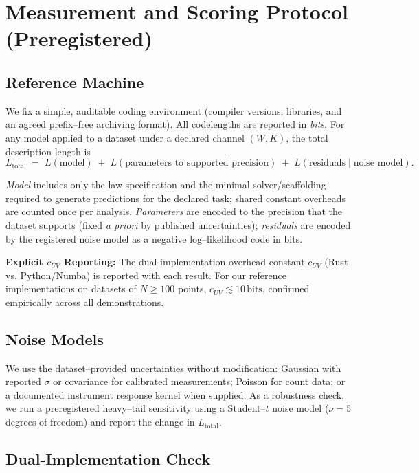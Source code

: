 \documentclass[11pt,letterpaper]{article}
\theoremstyle{definition}
\theoremstyle{remark}
\begin{document}
\section{Measurement and Scoring Protocol (Preregistered)}

\subsection{Reference Machine}

We fix a simple, auditable coding environment (compiler versions, libraries, and an agreed prefix--free archiving format). All codelengths are reported in \emph{bits}. For any model applied to a dataset under a declared channel \((W,K)\), the total description length is
\begin{equation}\label{eq:total_length}
L_{\mathrm{total}}
\;=\;
L(\text{model})
\;+\;
L(\text{parameters to supported precision})
\;+\;
L(\text{residuals}\mid\text{noise model}).
\end{equation}

\emph{Model} includes only the law specification and the minimal solver/scaffolding required to generate predictions for the declared task; shared constant overheads are counted once per analysis. \emph{Parameters} are encoded to the precision that the dataset supports (fixed \emph{a priori} by published uncertainties); \emph{residuals} are encoded by the registered noise model as a negative log--likelihood code in bits.

\textbf{Explicit \(c_{UV}\) Reporting:} The dual-implementation overhead constant \(c_{UV}\) (Rust vs. Python/Numba) is reported with each result. For our reference implementations on datasets of \(N\ge 100\) points, \(c_{UV}\lesssim 10\,\text{bits}\), confirmed empirically across all demonstrations.

\subsection{Noise Models}

We use the dataset--provided uncertainties without modification: Gaussian with reported \(\sigma\) or covariance for calibrated measurements; Poisson for count data; or a documented instrument response kernel when supplied. As a robustness check, we run a preregistered heavy--tail sensitivity using a Student--\(t\) noise model (\(\nu=5\) degrees of freedom) and report the change in \(L_{\mathrm{total}}\).

\subsection{Dual-Implementation Check}
\end{document}
